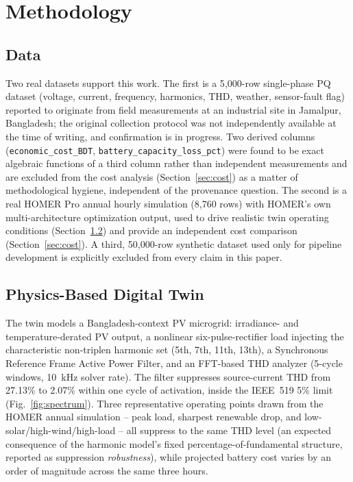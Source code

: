 \documentclass[conference,a4paper]{IEEEtran}
\begin{document}
\section{Methodology}

\subsection{Data}
Two real datasets support this work. The first is a 5{,}000-row
single-phase PQ dataset (voltage, current, frequency, harmonics, THD,
weather, sensor-fault flag) reported to originate from field
measurements at an industrial site in Jamalpur, Bangladesh; the
original collection protocol was not independently available at the
time of writing, and confirmation is in progress. Two derived columns
(\texttt{economic\_cost\_BDT}, \texttt{battery\_capacity\_loss\_pct})
were found to be exact algebraic functions of a third column rather
than independent measurements and are excluded from the cost analysis
(Section~\ref{sec:cost}) as a matter of methodological hygiene,
independent of the provenance question. The second is a real HOMER
Pro annual hourly simulation (8{,}760 rows) with HOMER's own
multi-architecture optimization output, used to drive realistic twin
operating conditions (Section~\ref{sec:twin}) and provide an
independent cost comparison (Section~\ref{sec:cost}). A third,
50{,}000-row synthetic dataset used only for pipeline development is
explicitly excluded from every claim in this paper.

\subsection{Physics-Based Digital Twin}
\label{sec:twin}
The twin models a Bangladesh-context PV microgrid: irradiance- and
temperature-derated PV output, a nonlinear six-pulse-rectifier load
injecting the characteristic non-triplen harmonic set (5th, 7th,
11th, 13th), a Synchronous Reference Frame Active Power Filter, and
an FFT-based THD analyzer (5-cycle windows, 10~kHz solver rate). The
filter suppresses source-current THD from 27.13\% to 2.07\% within
one cycle of activation, inside the IEEE~519 5\% limit
(Fig.~\ref{fig:spectrum}). Three representative
operating points drawn from the HOMER annual simulation -- peak load,
sharpest renewable drop, and low-solar/high-wind/high-load -- all
suppress to the same THD level (an expected consequence of the
harmonic model's fixed percentage-of-fundamental structure, reported
as suppression \emph{robustness}), while projected battery cost
varies by an order of magnitude across the same three hours.
\end{document}
